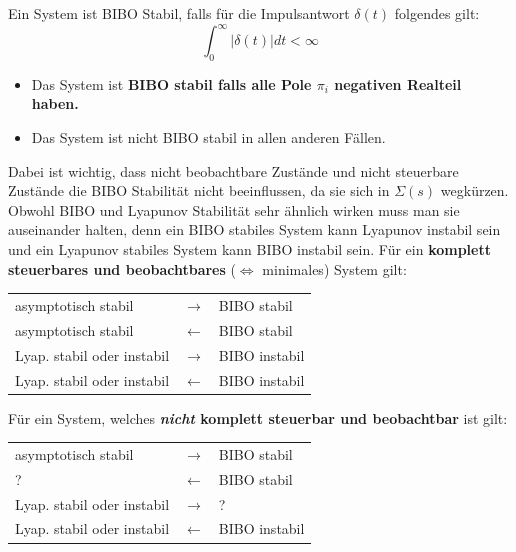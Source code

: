         Ein System ist BIBO Stabil, falls für die Impulsantwort $\delta(t)$ folgendes gilt:
        \[\int_0^\infty|\delta(t)|dt < \infty\]
        \begin{itemize}
            \item Das System ist \textbf{BIBO stabil falls alle Pole $\pi_i$ negativen Realteil haben.}
            \item Das System ist nicht BIBO stabil in allen anderen Fällen.
        \end{itemize}
        
        Dabei ist wichtig, dass nicht beobachtbare Zustände und nicht steuerbare Zustände die BIBO Stabilität nicht beeinflussen, da sie sich in $\Sigma(s)$ wegkürzen. Obwohl BIBO und Lyapunov Stabilität sehr ähnlich wirken muss man sie auseinander halten, denn ein BIBO stabiles System kann Lyapunov instabil sein und ein Lyapunov stabiles System kann BIBO instabil sein.
 \vfill\null\columnbreak
        Für ein \textbf{komplett steuerbares und beobachtbares} ($\Leftrightarrow$ minimales) System gilt:
        \begin{center}
            \begin{tabular}{l c l}
                 asymptotisch stabil & $\rightarrow$ & BIBO stabil \\
                 asymptotisch stabil & $\leftarrow$ & BIBO stabil \\
                 Lyap. stabil oder instabil & $\rightarrow$ & BIBO instabil\\
                 Lyap. stabil oder instabil & $\leftarrow$ & BIBO instabil
            \end{tabular}
        \end{center}
        
        Für ein System, welches \textbf{\textit{nicht} komplett steuerbar und beobachtbar} ist gilt:
       \begin{center}
            \begin{tabular}{l c l}
                 asymptotisch stabil & $\rightarrow$ & BIBO stabil \\
                 ? & $\leftarrow$ & BIBO stabil \\
                 Lyap. stabil oder instabil & $\rightarrow$ & ?\\
                 Lyap. stabil oder instabil & $\leftarrow$ & BIBO instabil
            \end{tabular}
        \end{center}
        
